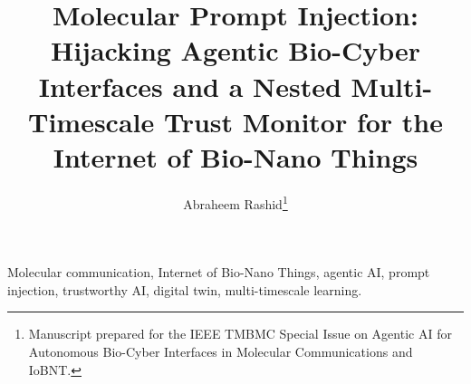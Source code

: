 \documentclass[journal]{IEEEtran}
\title{Molecular Prompt Injection: Hijacking Agentic Bio-Cyber Interfaces and a
Nested Multi-Timescale Trust Monitor for the Internet of Bio-Nano Things}
\author{Abraheem Rashid\thanks{Manuscript prepared for the IEEE TMBMC Special Issue on Agentic AI for Autonomous Bio-Cyber Interfaces in Molecular Communications and IoBNT.}}
\begin{document}
\maketitle

\begin{abstract}
\end{abstract}

\begin{IEEEkeywords}
Molecular communication, Internet of Bio-Nano Things, agentic AI, prompt
injection, trustworthy AI, digital twin, multi-timescale learning.
\end{IEEEkeywords}














\end{document}

